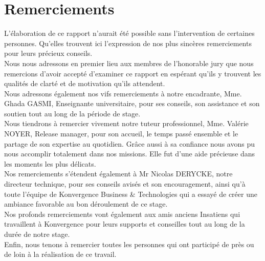 \chapter*{Remerciements}
\vspace{2cm}

L’élaboration de ce rapport n’aurait été possible sans l’intervention de certaines personnes. Qu’elles trouvent ici l’expression de nos plus sincères remerciements pour leurs précieux conseils.\\

Nous nous adressons en premier lieu aux membres de l’honorable jury que nous remercions d’avoir accepté d’examiner ce rapport en espérant qu’ils y trouvent les qualités de clarté et de motivation qu’ils attendent.\\

Nous adressons également nos vifs remerciements à notre encadrante, Mme. Ghada GASMI, Enseignante universitaire, pour ses conseils, son assistance et son soutien tout au long de la période de stage.\\

Nous tiendrons à remercier vivement notre tuteur professionnel, Mme. Valérie NOYER, Release manager, pour son accueil, le temps passé ensemble et le partage de son expertise au quotidien. Grâce aussi à sa confiance nous avons pu nous accomplir totalement dans nos missions. Elle fut d'une aide précieuse dans les moments les plus délicats.\\

Nos remerciements s’étendent également à Mr Nicolas DERYCKE, notre directeur technique, pour ses conseils avisés et son encouragement, ainsi qu'à toute l’équipe de Konvergence Business \& Technologies qui a essayé de créer une ambiance favorable au bon déroulement de ce stage.\\

Nos profonds remerciements vont également aux amis anciens Insatiens qui travaillent à Konvergence pour leurs supports et conseilles tout au long de la durée de notre stage.\\

Enfin, nous tenons à remercier toutes les personnes qui ont participé de près ou de loin à la réalisation de ce travail.
